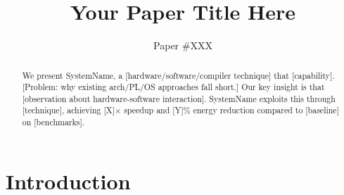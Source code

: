 \documentclass[sigplan,10pt]{acmart}
\newcommand{\system}{SystemName\xspace}
\begin{document}
\title{Your Paper Title Here}

\author{Paper \#XXX}

%

\begin{abstract}
%

We present \system, a [hardware/software/compiler technique] that [capability].
[Problem: why existing arch/PL/OS approaches fall short.]
Our key insight is that [observation about hardware-software interaction].
\system exploits this through [technique], achieving [X]$\times$ speedup
and [Y]\% energy reduction compared to [baseline] on [benchmarks].
\end{abstract}

\maketitle
\pagestyle{plain}


\section{Introduction}
\label{sec:intro}
\end{document}
